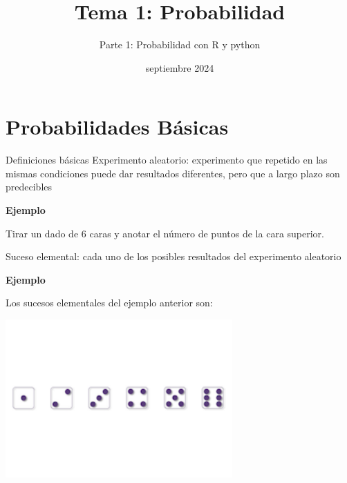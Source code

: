 \documentclass[
  ignorenonframetext,
  aspectratio=169]{beamer}
\title{Tema 1: Probabilidad}
\author{Parte 1: Probabilidad con R y python}
\date{septiembre 2024}
\begin{document}
\frame{\titlepage}

\section{Probabilidades Básicas}\label{probabilidades-buxe1sicas}

\begin{frame}{Definiciones básicas}
\label{definiciones-buxe1sicas}
Experimento aleatorio: experimento que repetido en las mismas
condiciones puede dar resultados diferentes, pero que a largo plazo son
predecibles

\textbf{Ejemplo}

Tirar un dado de 6 caras y anotar el número de puntos de la cara
superior.

Suceso elemental: cada uno de los posibles resultados del experimento
aleatorio

\textbf{Ejemplo}

Los sucesos elementales del ejemplo anterior son:

\begin{center}
\includegraphics[width=0.65\textwidth,height=\textheight]{Tema_1_Probabilidad_error_files/figure-beamer/unnamed-chunk-1-1.pdf}
\end{center}
\end{frame}
\end{document}
